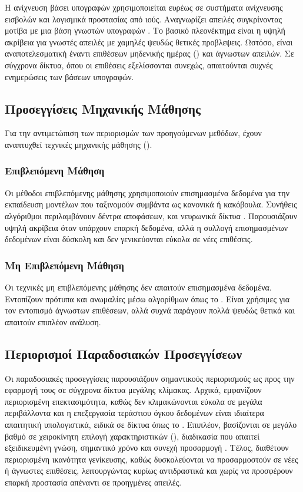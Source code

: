 Η ανίχνευση βάσει υπογραφών χρησιμοποιείται ευρέως σε συστήματα ανίχνευσης εισβολών και λογισμικά προστασίας από ιούς. Αναγνωρίζει απειλές συγκρίνοντας μοτίβα με μια βάση γνωστών υπογραφών \cite{garcia2009anomaly}. Το βασικό πλεονέκτημα είναι η υψηλή ακρίβεια για γνωστές απειλές με χαμηλές ψευδώς θετικές προβλεψεις. Ωστόσο, είναι αναποτελεσματική έναντι επιθέσεων μηδενικής ημέρας () και άγνωστων απειλών. Σε σύγχρονα δίκτυα, όπου οι επιθέσεις εξελίσσονται συνεχώς, απαιτούνται συχνές ενημερώσεις των βάσεων υπογραφών.

\subsection{Προσεγγίσεις Μηχανικής Μάθησης}

Για την αντιμετώπιση των περιορισμών των προηγούμενων μεθόδων, έχουν αναπτυχθεί τεχνικές μηχανικής μάθησης ().

\subsubsection{Επιβλεπόμενη Μάθηση}

Οι μέθοδοι επιβλεπόμενης μάθησης χρησιμοποιούν επισημασμένα δεδομένα για την εκπαίδευση μοντέλων που ταξινομούν συμβάντα ως κανονικά ή κακόβουλα. Συνήθεις αλγόριθμοι περιλαμβάνουν δέντρα αποφάσεων,  και νευρωνικά δίκτυα \cite{nguyen2018deep}. Παρουσιάζουν υψηλή ακρίβεια όταν υπάρχουν επαρκή δεδομένα, αλλά η συλλογή επισημασμένων δεδομένων είναι δύσκολη και δεν γενικεύονται εύκολα σε νέες επιθέσεις.

\subsubsection{Μη Επιβλεπόμενη Μάθηση}

Οι τεχνικές μη επιβλεπόμενης μάθησης δεν απαιτούν επισημασμένα δεδομένα. Εντοπίζουν πρότυπα και ανωμαλίες μέσω αλγορίθμων όπως το  \cite{garcia2009anomaly}. Είναι χρήσιμες για τον εντοπισμό άγνωστων επιθέσεων, αλλά συχνά παράγουν πολλά ψευδώς θετικά και απαιτούν επιπλέον ανάλυση.

\subsection{Περιορισμοί Παραδοσιακών Προσεγγίσεων}

Οι παραδοσιακές προσεγγίσεις παρουσιάζουν σημαντικούς περιορισμούς ως προς την εφαρμογή τους σε σύγχρονα δίκτυα μεγάλης κλίμακας. Αρχικά, εμφανίζουν περιορισμένη επεκτασιμότητα, καθώς δεν κλιμακώνονται εύκολα σε μεγάλα περιβάλλοντα και η επεξεργασία τεράστιου όγκου δεδομένων είναι ιδιαίτερα απαιτητική υπολογιστικά, ειδικά σε δίκτυα όπως το . Επιπλέον, βασίζονται σε μεγάλο βαθμό σε χειροκίνητη επιλογή χαρακτηριστικών (), διαδικασία που απαιτεί εξειδικευμένη γνώση, σημαντικό χρόνο και συνεχή προσαρμογή \cite{he2017drain}. Τέλος, διαθέτουν περιορισμένη ικανότητα γενίκευσης, καθώς δυσκολεύονται να προσαρμοστούν σε νέες ή άγνωστες επιθέσεις, λειτουργώντας κυρίως αντιδραστικά και χωρίς να προσφέρουν επαρκή προστασία απέναντι σε προηγμένες απειλές.